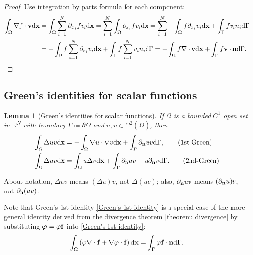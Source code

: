 \documentclass[oneside]{book}
\numberwithin{equation}{section}
\newtheorem{lemma}{Lemma}[section]
\begin{document}
\begin{proof}
    Use integration by parts formula for each component:
    \begin{align*}
        \int_\Omega \nabla f\cdot{\bf v}{\rm d}{\bf x} &= \int_\Omega \sum_{i=1}^N \partial_{x_i}fv_i{\rm d}{\bf x} = \sum_{i=1}^N \int_\Omega \partial_{x_i}fv_i{\rm d}{\bf x} = \sum_{i=1}^N -\int_\Omega f\partial_{x_i}v_i{\rm d}{\bf x} + \int_\Gamma fv_in_i{\rm d}\Gamma\\
        &= -\int_\Omega f\sum_{i=1}^N \partial_{x_i}v_i{\rm d}{\bf x} + \int_\Gamma f\sum_{i=1}^N v_in_i{\rm d}\Gamma = -\int_\Omega f\nabla\cdot{\bf v}{\rm d}{\bf x} + \int_\Gamma f{\bf v}\cdot{\bf n}{\rm d}\Gamma.
    \end{align*}
\end{proof}

\subsection{Green's identities for scalar functions}

\begin{lemma}[Green's identities for scalar functions]
    If $\Omega$ is a bounded $C^1$ open set in $\mathbb{R}^N$ with boundary $\Gamma\coloneqq\partial\Omega$ and $u,v\in C^2(\overline{\Omega})$, then
    \begin{align}
        \int_\Omega \Delta uv{\rm d}{\bf x} &= -\int_\Omega \nabla u\cdot\nabla v{\rm d}{\bf x} + \int_\Gamma \partial_{\bf n}uv{\rm d}\Gamma,\label{Green's 1st identity}\tag{1st-Green}\\
        \int_\Omega \Delta uv{\rm d}{\bf x} &= \int_\Omega u\Delta v{\rm d}{\bf x} + \int_\Gamma \partial_{\bf n}uv - u\partial_{\bf n}v{\rm d}\Gamma.\label{Green's 2nd identity}\tag{2nd-Green}
    \end{align}
\end{lemma}
About notation, $\Delta uv$ means $(\Delta u)v$, not $\Delta(uv)$; also, $\partial_{\bf n}uv$ means $(\partial_{\bf n}u)v$, not $\partial_{\bf n}(uv)$.

%
Note that Green's 1st identity \eqref{Green's 1st identity} is a special case of the more general identity derived from the divergence theorem \ref{theorem: divergence} by substituting $\boldsymbol{\varphi} = \varphi{\bf f}$ into \eqref{Green's 1st identity}:
\begin{align}
    \label{divergence theorem's consequence}
    \int_\Omega \left(\varphi\nabla\cdot{\bf f} + \nabla\varphi\cdot{\bf f}\right){\rm d}{\bf x} = \int_\Gamma \varphi{\bf f}\cdot{\bf n}{\rm d}\Gamma.
\end{align}
\end{document}
